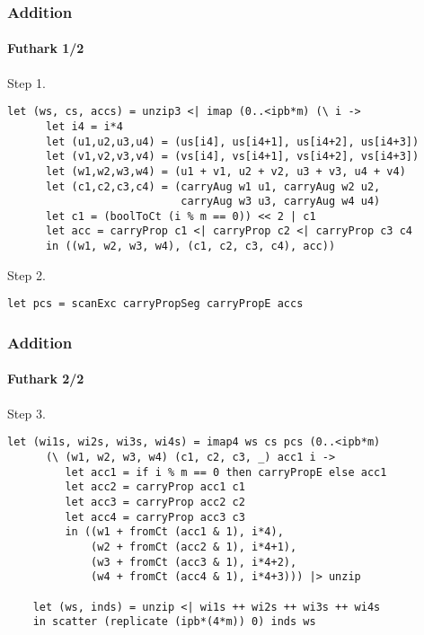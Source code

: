 \begin{frame}[fragile]
  \frametitle{Addition}
  \framesubtitle{Futhark 1/2}
  Step 1.
\begin{lstlisting}[language=futhark,gobble=4,basicstyle=\scriptsize]
    let (ws, cs, accs) = unzip3 <| imap (0..<ipb*m) (\ i ->
      let i4 = i*4
      let (u1,u2,u3,u4) = (us[i4], us[i4+1], us[i4+2], us[i4+3])
      let (v1,v2,v3,v4) = (vs[i4], vs[i4+1], vs[i4+2], vs[i4+3])
      let (w1,w2,w3,w4) = (u1 + v1, u2 + v2, u3 + v3, u4 + v4)
      let (c1,c2,c3,c4) = (carryAug w1 u1, carryAug w2 u2,
                           carryAug w3 u3, carryAug w4 u4)
      let c1 = (boolToCt (i % m == 0)) << 2 | c1
      let acc = carryProp c1 <| carryProp c2 <| carryProp c3 c4
      in ((w1, w2, w3, w4), (c1, c2, c3, c4), acc))
\end{lstlisting}
  Step 2.
\begin{lstlisting}[language=futhark,gobble=4,basicstyle=\scriptsize,firstnumber=11]
    let pcs = scanExc carryPropSeg carryPropE accs
\end{lstlisting}
\end{frame}

\begin{frame}[fragile]
  \frametitle{Addition}
  \framesubtitle{Futhark 2/2}
  Step 3.
\begin{lstlisting}[language=futhark,gobble=4,basicstyle=\scriptsize,firstnumber=12]
    let (wi1s, wi2s, wi3s, wi4s) = imap4 ws cs pcs (0..<ipb*m)
      (\ (w1, w2, w3, w4) (c1, c2, c3, _) acc1 i ->
         let acc1 = if i % m == 0 then carryPropE else acc1
         let acc2 = carryProp acc1 c1
         let acc3 = carryProp acc2 c2
         let acc4 = carryProp acc3 c3
         in ((w1 + fromCt (acc1 & 1), i*4),
             (w2 + fromCt (acc2 & 1), i*4+1),
             (w3 + fromCt (acc3 & 1), i*4+2),
             (w4 + fromCt (acc4 & 1), i*4+3))) |> unzip

    let (ws, inds) = unzip <| wi1s ++ wi2s ++ wi3s ++ wi4s
    in scatter (replicate (ipb*(4*m)) 0) inds ws
\end{lstlisting}
\end{frame}


